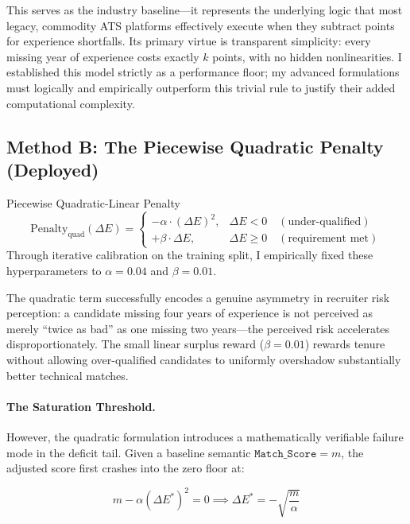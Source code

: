 This serves as the industry baseline---it represents the underlying logic that most legacy, commodity ATS platforms effectively execute when they subtract points for experience shortfalls. Its primary virtue is transparent simplicity: every missing year of experience costs exactly $k$ points, with no hidden nonlinearities. I established this model strictly as a performance floor; my advanced formulations must logically and empirically outperform this trivial rule to justify their added computational complexity.

\subsection{Method B: The Piecewise Quadratic Penalty (Deployed)}
\label{subsec:method_b}

\begin{definitionbox}{Piecewise Quadratic-Linear Penalty}
\begin{equation}
\text{Penalty}_{\text{quad}}(\Delta E) =
\begin{cases}
-\alpha \cdot (\Delta E)^2, & \Delta E < 0 \quad (\text{under-qualified}) \\
+\beta \cdot \Delta E, & \Delta E \ge 0 \quad (\text{requirement met})
\end{cases}
\label{eq:quadratic_penalty}
\end{equation}
Through iterative calibration on the training split, I empirically fixed these hyperparameters to $\alpha = 0.04$ and $\beta = 0.01$.
\end{definitionbox}

The quadratic term successfully encodes a genuine asymmetry in recruiter risk perception: a candidate missing four years of experience is not perceived as merely ``twice as bad'' as one missing two years---the perceived risk accelerates disproportionately. The small linear surplus reward ($\beta = 0.01$) rewards tenure without allowing over-qualified candidates to uniformly overshadow substantially better technical matches.

\paragraph{The Saturation Threshold.} However, the quadratic formulation introduces a mathematically verifiable failure mode in the deficit tail. Given a baseline semantic $\texttt{Match\_Score} = m$, the adjusted score first crashes into the zero floor at:

\begin{equation}
m - \alpha(\Delta E^*)^2 = 0 \implies \Delta E^* = -\sqrt{\frac{m}{\alpha}}
\label{eq:quad_threshold}
\end{equation}

